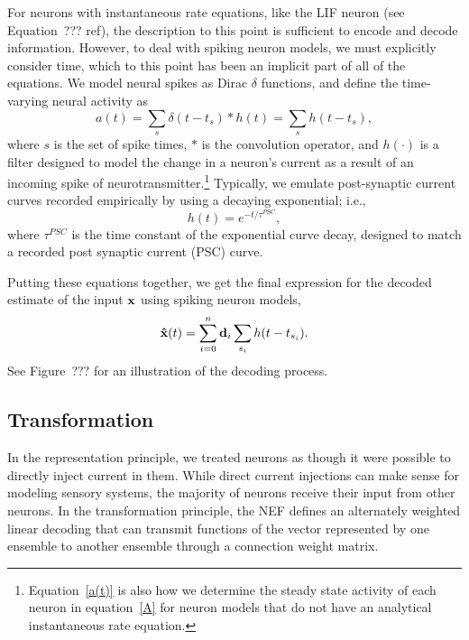 For neurons with instantaneous rate equations,
like the LIF neuron (see Equation~??? ref),
the description to this point
is sufficient to encode and decode information.
However, to deal with spiking neuron models,
we must explicitly consider time,
which to this point has been an implicit
part of all of the equations.
We model neural spikes as
Dirac $\delta$ functions,
and define the time-varying
neural activity as
\begin{equation}
  \label{a(t)}
  a(t) = \sum_s \delta(t - t_s) * h(t) = \sum_s h(t - t_s),
\end{equation}
where $s$ is the set of spike times,
$*$ is the convolution operator,
and $h(\cdot)$ is a filter designed to
model the change in a neuron's current
as a result of an incoming spike
of neurotransmitter.\footnote{
  Equation~\eqref{a(t)} is also how we determine
  the steady state activity of each neuron in
  equation~\eqref{A} for neuron models
  that do not have an analytical
  instantaneous rate equation.}
Typically, we emulate post-synaptic current curves
recorded empirically by using a decaying exponential;
i.e.,
\begin{equation}
  h(t) = e^{-t / \tau^{PSC}},
\end{equation}
where $\tau^{PSC}$ is the time constant
of the exponential curve decay,
designed to match
a recorded post synaptic current (PSC) curve.

Putting these equations together,
we get the final expression for
the decoded estimate of the input $\mathbf{x}$
using spiking neuron models,
\begin{equation}
  \label{dec-time}
  \mathbf{\hat{x}}(t) = \sum_{i=0}^n \mathbf{d}_i \sum_{s_i} h(t-t_{s_i}).
\end{equation}
See Figure~??? for an illustration of
the decoding process.


\subsection{Transformation}

In the representation principle,
we treated neurons as though
it were possible to directly inject current in them.
While direct current injections
can make sense for modeling
sensory systems,
the majority of neurons
receive their input from other neurons.
In the transformation principle,
the NEF defines an alternately weighted
linear decoding
that can transmit functions
of the vector represented
by one ensemble to another ensemble
through a connection weight matrix.

